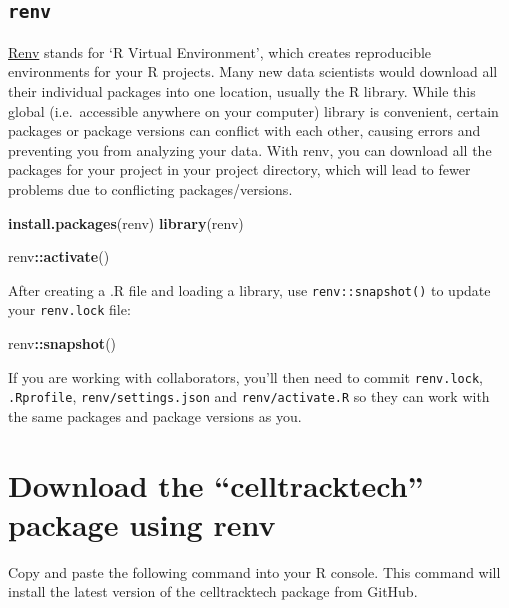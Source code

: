 \documentclass[
]{book}
\newenvironment{Shaded}{\begin{snugshade}}{\end{snugshade}}
\newcommand{\FunctionTok}[1]{\textcolor[rgb]{0.13,0.29,0.53}{\textbf{#1}}}
\newcommand{\NormalTok}[1]{#1}
\newcommand{\SpecialCharTok}[1]{\textcolor[rgb]{0.81,0.36,0.00}{\textbf{#1}}}
\newcommand{\StringTok}[1]{\textcolor[rgb]{0.31,0.60,0.02}{#1}}
\begin{document}
\subsection{\texorpdfstring{\texttt{renv}}{renv}}\label{renv}

\href{https://rstudio.github.io/renv/articles/renv.html}{Renv} stands for `R Virtual Environment', which creates reproducible environments for your R projects. Many new data scientists would download all their individual packages into one location, usually the R library. While this global (i.e.~accessible anywhere on your computer) library is convenient, certain packages or package versions can conflict with each other, causing errors and preventing you from analyzing your data. With renv, you can download all the packages for your project in your project directory, which will lead to fewer problems due to conflicting packages/versions.

\begin{Shaded}
\begin{Highlighting}[]
\FunctionTok{install.packages}\NormalTok{(}\StringTok{\textquotesingle{}renv\textquotesingle{}}\NormalTok{)}
\FunctionTok{library}\NormalTok{(renv)}

\NormalTok{renv}\SpecialCharTok{::}\FunctionTok{activate}\NormalTok{()}
\end{Highlighting}
\end{Shaded}

After creating a .R file and loading a library, use \texttt{renv::snapshot()} to update your \texttt{renv.lock} file:

\begin{Shaded}
\begin{Highlighting}[]
\NormalTok{renv}\SpecialCharTok{::}\FunctionTok{snapshot}\NormalTok{()}
\end{Highlighting}
\end{Shaded}

If you are working with collaborators, you'll then need to commit \texttt{renv.lock}, \texttt{.Rprofile}, \texttt{renv/settings.json} and \texttt{renv/activate.R} so they can work with the same packages and package versions as you.

\section{Download the ``celltracktech'' package using renv}\label{download-the-celltracktech-package-using-renv}

Copy and paste the following command into your R console. This command will install the latest version of the celltracktech package from GitHub.
\end{document}
